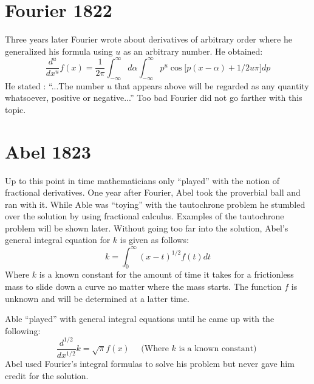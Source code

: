 \documentclass[a4paper,14pt,oneside]{book}
\theoremstyle{plain}
\theoremstyle{definition}
\theoremstyle{remark}
\begin{document}
         \section{Fourier 1822}
         
         \begin{center}
         \begin{flushleft} 
         \justify
         \Large{
\par{Three years later Fourier wrote about derivatives of arbitrary order where he generalized his formula using $u$ as an arbitrary number. He obtained:$$
\frac{d^{u}}{d x^{u}} f(x)=\frac{1}{2 \pi} \int_{-\infty}^{\infty} d\alpha \int_{-\infty}^{\infty} p^{u} \cos \Big[p(x-\alpha)+1 / 2 u \pi \Big] dp
$$
He stated \cite{bb4} : \enquote{...The number $u$ that appears above will be regarded as any quantity whatsoever, positive or negative...} Too bad Fourier did not go farther with this topic.}}
\end{flushleft}        
\end{center}

\section{Abel 1823}
         \begin{center}
         \begin{flushleft}
         \justify
         \Large{
\par{Up to this point in time mathematicians only \enquote{played} with the notion of fractional derivatives. One year after Fourier, Abel \cite{bb7} took the proverbial ball and ran with it. While Able was \enquote{toying} with the tautochrone problem he stumbled over the solution by using fractional calculus. Examples of the tautochrone problem will be shown later. Without going too far into the solution, Abel's general integral equation for $k$ is given as follows:
$$
k=\int_{0}^{\infty}(x-t)^{1 /2} f(t)dt
$$
Where $k$ is a known constant for the amount of time it takes for a frictionless mass to slide down a curve no matter where the mass starts. The function $f$ is unknown and will be determined at a latter time.
\par{Able \enquote{played} with general integral equations until he came up with the
following:}
$$
\frac{d^{1/2}}{dx^{1 / 2}} k=\sqrt{\pi} f(x) 
\quad \text { (Where } k \text { is a known constant) }
$$
Abel used Fourier's integral formulas to solve his problem but never gave him credit for the solution.}}
\end{flushleft}        \end{center}
\end{document}
